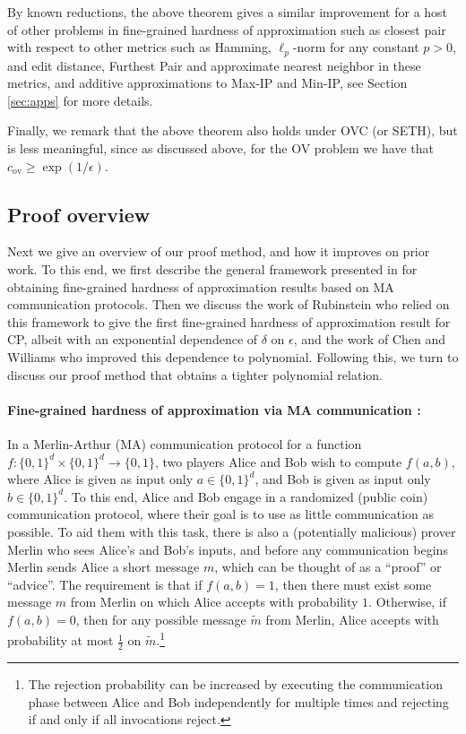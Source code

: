 \documentclass[11pt]{article}
\theoremstyle{plain}
\theoremstyle{remark}
\newcommand{\ov}{\mathrm{ov}}
\begin{document}
By known reductions, the above theorem gives a similar improvement for a host of other problems in fine-grained hardness of approximation such as closest pair with respect to other metrics such as Hamming,  $\ell_p$-norm for any constant $p>0$, and edit distance, Furthest Pair and approximate nearest neighbor in these metrics, and additive approximations to Max-IP and Min-IP, see Section \ref{sec:apps} for more details. 

Finally, we remark that the above theorem also holds under OVC (or SETH), but is less meaningful, since as discussed above, for the OV problem we have that $c_{\ov} \geq \exp(1/\epsilon)$. 

\subsection{Proof overview}

Next we give an overview of our proof method, and how it improves on prior work. To this end, we first describe the general framework presented in \cite{ARW17} for obtaining fine-grained hardness of approximation results based on MA communication protocols. Then we discuss the work of Rubinstein \cite{Rub18} who relied on this framework to give the first fine-grained hardness of approximation result for CP, albeit with an exponential dependence of $\delta$ on $\epsilon$, and the work of Chen and Williams \cite{CW19} who improved this dependence to polynomial. Following this, we turn to discuss our proof method that obtains a tighter polynomial relation.

\paragraph{Fine-grained hardness of approximation via MA communication \cite{ARW17}:}  In a Merlin-Arthur (MA) communication protocol for a function $f: \{0,1\}^d \times \{0,1\}^d \to \{0,1\}$, two players
Alice and Bob wish to compute
$f(a,b)$, where Alice is given as input only
$a \in\{0,1\}^d$, and Bob is given as input only $b \in \{0,1\}^d$.
To this end, Alice and Bob engage in a randomized (public coin) communication protocol, where their goal is to use as little communication as possible. 
To aid them with this task, there is also  a (potentially malicious)
prover Merlin who sees Alice's and Bob's inputs, and before any communication
begins Merlin sends Alice a short message $m$, which can be thought of as a ``proof'' or ``advice''. 
The requirement is that if $f(a,b)=1$, then there must exist
some message $m$ from Merlin on which Alice accepts with probability
$1$. Otherwise, if $f(a,b)=0$, then for any possible message $\tilde m$ from Merlin, Alice accepts with probability
at most $\frac 12$ on $\tilde m$.\footnote{The rejection probability can be increased by executing the communication phase between Alice and Bob independently for multiple times and rejecting if and only if all invocations reject.} 
\end{document}
